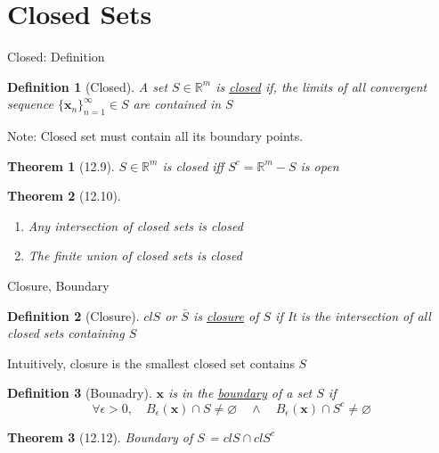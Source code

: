 \documentclass[a4paper,11pt]{article}
\newtheorem{defn}{Definition}
\newtheorem{thm}{Theorem}
\begin{document}

\section{Closed Sets} %
\label{sec:closed_sets}
\begin{frame}[t]{Closed: Definition}
	\begin{defn}
		[Closed]
		A set $S\in\mathbb{R}^m$ is \uline{closed} if, the limits of all convergent sequence $\{\mathbf{x}_n\}_{n=1}^\infty\in S$ are contained in $S$
	\end{defn}
	Note: Closed set must contain all its boundary points. 
	\begin{thm}
		[12.9] $S\in\mathbb{R}^m$ is closed iff $S^c=\mathbb{R}^m - S$ is open
	\end{thm}
	\begin{thm}
		[12.10]
		\begin{enumerate}
			\item Any intersection of closed sets is closed
			\item The finite union of closed sets is closed
		\end{enumerate}
	\end{thm}
\end{frame}
\begin{frame}[t]{Closure, Boundary}
	\begin{defn}
		[Closure] $cl S$ or $\bar S$ is \uline{closure} of $S$ if It is the intersection of all closed sets containing $S$
	\end{defn}
	Intuitively, closure is the smallest closed set contains $S$
	\begin{defn}
		[Bounadry] $\mathbf{x}$ is in the \uline{boundary} of a set $S$ if \[
			\forall \epsilon>0, \quad B_\epsilon(\mathbf{x})\cap S \neq \varnothing \quad\land\quad B_\epsilon(\mathbf{x})\cap S^c \neq \varnothing
		\]
	\end{defn}
	\begin{thm}
		[12.12] Boundary of $S$ = $cl S \cap cl S^c$
	\end{thm}
\end{frame}
\end{document}
